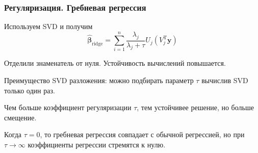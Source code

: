 \documentclass[ucs, notheorems, handout]{beamer}
\newcommand{\betah}{\hat{\bm \beta}}
\newcommand{\betaa}{\bm{\beta}}
\newcommand{\E}{\mathrm{E}}
\newcommand{\D}{\mathrm{D}}
\begin{document}
\begin{frame}
	\frametitle{Регуляризация. Гребневая регрессия}

	
	Используем SVD и получим
	$$\betah_{\text{ridge}} = \sum_{i = 1}^n \frac{\lambda_j}{\lambda_j + \tau} U_j(V_j^\mathrm T\bm y)$$
	
	Отделили знаменатель от нуля. Устойчивость вычислений повышается.
	
	Преимущество SVD разложения: можно подбирать параметр $\tau$ вычислив SVD только один раз.
	
Чем больше коэффициент регуляризации $\tau$, тем устойчивее решение, но больше смещение. 

Когда $\tau = 0$, то гребневая регрессия совпадает с обычной регрессией, но при $\tau \rightarrow \infty$ коэффициенты регрессии стремятся к нулю.
	
	\note{
		
	}
\end{frame}

\end{document}
